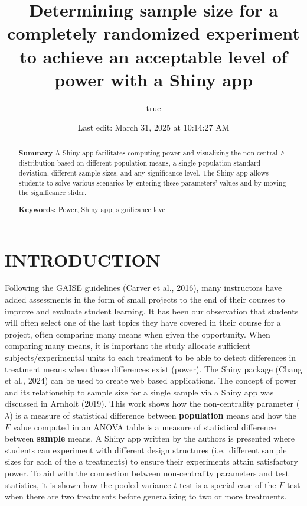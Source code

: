 \documentclass[
]{article}
\title{Determining sample size for a completely randomized experiment to achieve an acceptable level of power with a Shiny app}
\author{true}
\date{Last edit: March 31, 2025 at 10:14:27 AM}
\begin{document}
\maketitle
\begin{abstract}
\textbf{Summary} A Shiny app facilitates computing power and visualizing the non-central \emph{F} distribution based on different population means, a single population standard deviation, different sample sizes, and any significance level. The Shiny app allows students to solve various scenarios by entering these parameters' values and by moving the significance slider.

\textbf{Keywords:} Power, Shiny app, significance level
\end{abstract}

\hypertarget{introduction}{%
\section*{INTRODUCTION}\label{introduction}}

Following the GAISE guidelines (Carver et al., 2016), many instructors have added assessments in the form of small projects to the end of their courses to improve and evaluate student learning. It has been our observation that students will often select one of the last topics they have covered in their course for a project, often comparing many means when given the opportunity. When comparing many means, it is important the study allocate sufficient subjects/experimental units to each treatment to be able to detect differences in treatment means when those differences exist (power). The Shiny package (Chang et al., 2024) can be used to create web based applications. The concept of power and its relationship to sample size for a single sample via a Shiny app was discussed in Arnholt (2019). This work shows how the non-centrality parameter (\(\lambda\)) is a measure of statistical difference between \textbf{population} means and how the \(F\) value computed in an ANOVA table is a measure of statistical difference between \textbf{sample} means. A Shiny app written by the authors is presented where students can experiment with different design structures (i.e.~different sample sizes for each of the \(a\) treatments) to ensure their experiments attain satisfactory power. To aid with the connection between non-centrality parameters and test statistics, it is shown how the pooled variance \(t\)-test is a special case of the \(F\)-test when there are two treatments before generalizing to two or more treatments.
\end{document}
